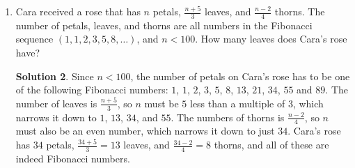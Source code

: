 \documentclass{article}
\theoremstyle{definition}
\newtheorem*{solution}{Solution}
\begin{document}
\begin{enumerate}
        Northeast-Southwest (NE-SW), North-South (N-S), and Northwest-Southeast
        (NW-SE). If the lawn is first mowed E-W on Day $1$, on Day $201$ in
        which direction is the lawn mowed, E-W, NE-SW, N-S, or NW-SE?
        \begin{solution}
            The lawn is mowed on days $1, 6, 11, 16, \dot, 191, 196, 201$. This
            is an arithmetic sequence and the common difference is $5$, since
            the lawn is mowed every $5$ days. To get from $1$ to $201$, the
            common difference will have been added $\frac{201 - 1}{5} =
            \frac{200}{5} = 40$ times. This means day $201$ will be the $41$st
            mowing. For the first $40$ mowing days, the lawn will have been
            mowed $\frac{40}{4} = 10$ times in each of the directions E-W,
            NE-SW, N-S, and NW-SE. Therefore, for the $41$st mowing, on Day
            $201$, the sequence of directions will begin again with a mowing in
            the direction on E-W or East-West.
        \end{solution}
        \item Cara received a rose that has $n$ petals, $\frac{n + 5}{3}$
        leaves, and $\frac{n-2}{4}$ thorns. The number of petals, leaves, and
        thorns are all numbers in the Fibonacci sequence $(1, 1, 2, 3, 5, 8,
        \dots)$, and $n < 100$. How many leaves does Cara's rose have?
        \begin{solution}
            Since $n < 100$, the number of petals on Cara's rose has to be one
            of the following Fibonacci numbers: $1$, $1$, $2$, $3$, $5$, $8$,
            $13$, $21$, $34$, $55$ and $89$. The number of leaves is $\frac{n +
            5}{3}$, so $n$ must be $5$ less than a multiple of $3$, which narrows it
            down to $1$, $13$, $34$, and $55$. The numbers of thorns is $\frac{n
            - 2}{4}$, so $n$ must also be an even number, which narrows it down
            to just $34$. Cara's rose has $34$ petals, $\frac{34 + 5}{3} = 13$
            leaves, and $\frac{34 - 2}{4} = 8$ thorns, and all of these are
            indeed Fibonacci numbers.
        \end{solution}
    \end{enumerate}
\end{document}
